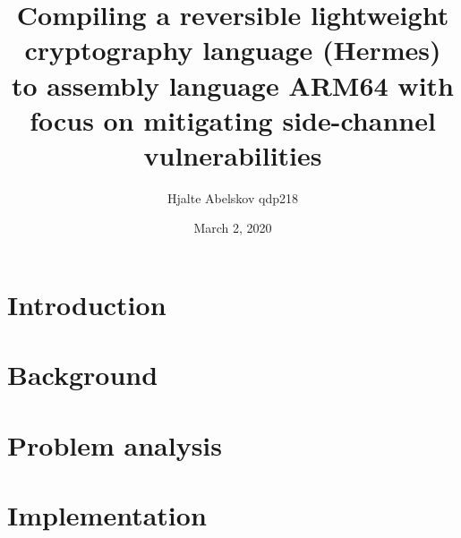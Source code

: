 \documentclass[a4paper,10pt,openright]{memoir}
\title{Compiling a reversible lightweight cryptography language (Hermes) to assembly language ARM64 with focus on mitigating side-channel vulnerabilities}
\author{Hjalte Abelskov qdp218}
\date{March 2, 2020} %
\begin{document}
\maketitle
{}
\setcounter{page}{3}

\cleardoublepage
\pagestyle{plain}
\begin{abstract}

\end{abstract}

\clearpage
\begin{resume}

\end{resume}

\setcounter{tocdepth}{1} %
\cleardoublepage
{}
\tableofcontents*

\cleardoublepage
{}
\setcounter{page}{1}

\chapter{Introduction}

%


\chapter{Background}
\label{chapt - Reversible-computing}




\label{chapt - Side-channel}





\chapter{Problem analysis}



\chapter{Implementation}

%
%
\end{document}
